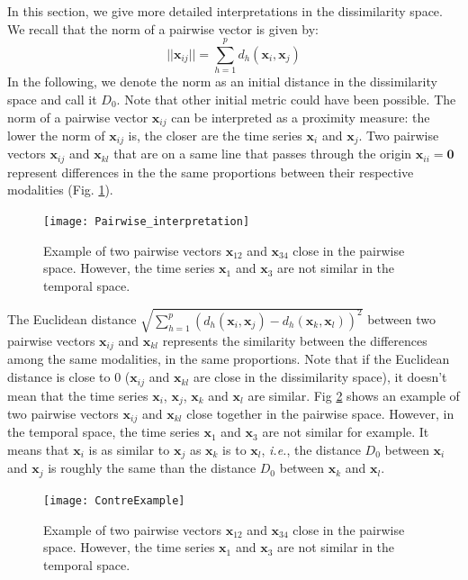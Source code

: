 In this section, we give more detailed interpretations in the dissimilarity space. 
We recall that the norm of a pairwise vector is given by: 
\begin{equation}
||\textbf{x}_{ij}|| = \sum\limits_{h=1}^{p} d_h(\textbf{x}_{i},\textbf{x}_{j})
\end{equation}
In the following, we denote the norm as an initial distance in the dissimilarity space and call it $D_0$. Note that other initial metric could have been possible. The norm of a pairwise vector $\textbf{x}_{ij}$ can be interpreted as a proximity measure: the lower the norm of $\textbf{x}_{ij}$ is, the closer are the time series $\textbf{x}_{i}$ and $\textbf{x}_{j}$. Two pairwise vectors $\textbf{x}_{ij}$ and $\textbf{x}_{kl}$ that are on a same line that passes through the origin $\textbf{x}_{ii} = \textbf{0}$ represent differences in the the same proportions between their respective modalities (Fig. \ref{fig:pairwise_interpretation}). 

\begin{figure}[h!]
	\centering
	\texttt{[image: Pairwise\_interpretation]}
	\caption{Example of two pairwise vectors $\textbf{x}_{12}$ and $\textbf{x}_{34}$ close in the pairwise space. However, the time series $\textbf{x}_{1}$ and $\textbf{x}_{3}$ are not similar in the temporal space.}
	\label{fig:pairwise_interpretation}
\end{figure}

The Euclidean distance $\sqrt{\sum\limits_{h=1}^{p} (d_h(\textbf{x}_{i},\textbf{x}_{j})-d_h(\textbf{x}_{k},\textbf{x}_{l}))^2}$ between two pairwise vectors $\textbf{x}_{ij}$ and $\textbf{x}_{kl}$ represents the similarity between the differences among the same modalities, in the same proportions. Note that if the Euclidean distance is close to 0 ($\textbf{x}_{ij}$ and $\textbf{x}_{kl}$ are close in the dissimilarity space), it doesn't mean that the time series $\textbf{x}_{i}$, $\textbf{x}_{j}$, $\textbf{x}_{k}$ and $\textbf{x}_{l}$ are similar. Fig \ref{fig:ContreExample} shows an example of two pairwise vectors $\textbf{x}_{ij}$ and $\textbf{x}_{kl}$ close together in the pairwise space. However, in the temporal space, the time series $\textbf{x}_{1}$ and $\textbf{x}_{3}$ are not similar for example. It means that $\textbf{x}_i$ is as similar to $\textbf{x}_j$ as $\textbf{x}_k$ is to $\textbf{x}_l$, \textit{i.e.}, the distance $D_0$ between $\textbf{x}_i$ and $\textbf{x}_j$ is roughly the same than the distance $D_0$ between $\textbf{x}_k$ and $\textbf{x}_l$.

\begin{figure}[h!]
	\centering
	\texttt{[image: ContreExample]}
	\caption{Example of two pairwise vectors $\textbf{x}_{12}$ and $\textbf{x}_{34}$ close in the pairwise space. However, the time series $\textbf{x}_{1}$ and $\textbf{x}_{3}$ are not similar in the temporal space.}
	\label{fig:ContreExample}
\end{figure}


